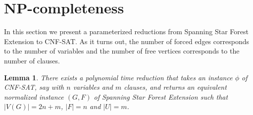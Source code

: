 \documentclass[en]{pracamgr}
\newtheorem{lemma}{Lemma}
\theoremstyle{definition}
\newcommand{\ssfep}{{\sc Spanning Star Forest Extension}}
\newcommand{\cnfsat}{{\sc CNF-SAT}}
\begin{document}
\section{NP-completeness}

In this section we present a parameterized reductions from \ssfep{} to \cnfsat{}. As it turns out, the number of forced edges corresponds to the number of variables and the number of free vertices corresponds to the number of clauses.

\begin{lemma}\label{ssfep reduction}
	There exists a polynomial time reduction that takes an instance $\phi$ of \cnfsat{}, say with $n$ variables and $m$ clauses, and returns an equivalent normalized instance $(G,F)$ of \ssfep{} such that $|V(G)|=2n+m$, $|F|=n$ and $|U|=m$.
\end{lemma}
\end{document}
